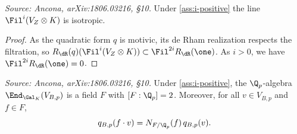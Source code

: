 \begin{lemma}
  \label{lem:isotropic-line}
  \textit{Source: Ancona, arXiv:1806.03216, \S10.}
  Under \cref{ass:i-positive} the line \(\Fil^i(V_Z \otimes K)\) is isotropic.
\end{lemma}

\begin{proof}
  As the quadratic form \(q\) is motivic, its de Rham realization respects the
  filtration, so \(R_\dR(q)(\Fil^i(V_Z \otimes K)) \subset \Fil^{2i} R_\dR(\one)\).
  As \(i > 0\), we have \(\Fil^{2i} R_\dR(\one) = 0\).
\end{proof}

\begin{proposition}
  \label{prop:endo-field}
  \textit{Source: Ancona, arXiv:1806.03216, \S10.}
  Under \cref{ass:i-positive}, the \(\Q_p\)-algebra
  \(\End_{\Gal_K}(V_{B,p})\) is a field \(F\) with \([F : \Q_p] = 2\). Moreover,
  for all \(v \in V_{B,p}\) and \(f \in F\),
  \begin{equation}
    q_{B,p}(f \cdot v) = N_{F/\Q_p}(f)\, q_{B,p}(v).
  \end{equation}
\end{proposition}

